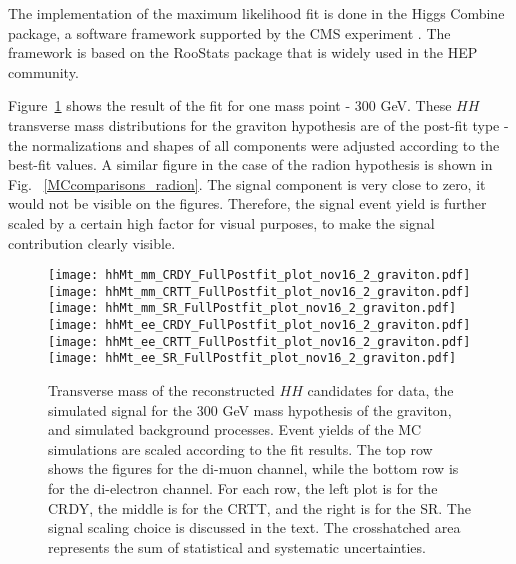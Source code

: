 The implementation of the maximum likelihood fit is done in the Higgs Combine package, a software framework supported by the CMS experiment \cite{HiggsCombine}. The framework is based on the RooStats package \cite{RooStats} that is widely used in the HEP community. 


Figure~\ref{MCcomparisons} shows the result of the fit for one mass point - 300 GeV. These $HH$ transverse mass distributions for the graviton hypothesis are of the post-fit type - the normalizations and shapes of all components were adjusted according to the best-fit values. A similar figure in the case of the radion hypothesis is shown in Fig. ~\ref{MCcomparisons_radion}. The signal component is very close to zero, it would not be visible on the figures. Therefore, the signal event yield is further scaled by a certain high factor for visual purposes, to make the signal contribution clearly visible. 

\begin{figure}[H]
\begin{center}
\texttt{[image: hhMt\_mm\_CRDY\_FullPostfit\_plot\_nov16\_2\_graviton.pdf]}
\texttt{[image: hhMt\_mm\_CRTT\_FullPostfit\_plot\_nov16\_2\_graviton.pdf]}
\texttt{[image: hhMt\_mm\_SR\_FullPostfit\_plot\_nov16\_2\_graviton.pdf]} \\
\texttt{[image: hhMt\_ee\_CRDY\_FullPostfit\_plot\_nov16\_2\_graviton.pdf]}
\texttt{[image: hhMt\_ee\_CRTT\_FullPostfit\_plot\_nov16\_2\_graviton.pdf]}
\texttt{[image: hhMt\_ee\_SR\_FullPostfit\_plot\_nov16\_2\_graviton.pdf]}
\caption[Transverse mass of the reconstructed $HH$ candidates for graviton hypothesis.]{Transverse mass of the reconstructed $HH$ candidates for data, the simulated signal for the 300 GeV mass hypothesis of the graviton, and simulated background processes. Event yields of the MC simulations are scaled according to the fit results. The top row shows the figures for the di-muon channel, while the bottom row is for the di-electron channel. For each row, the left plot is for the CRDY, the middle is for the CRTT, and the right is for the SR. The signal scaling choice is discussed in the text. The crosshatched area represents the sum of statistical and systematic uncertainties.
\label{MCcomparisons} } 
\end{center}
\end{figure}

